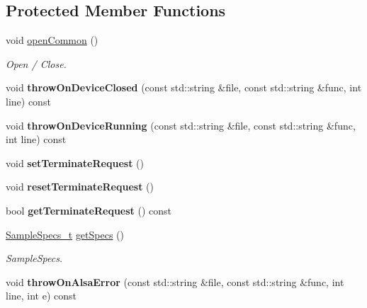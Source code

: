 \subsection*{Protected Member Functions}
\begin{DoxyCompactItemize}
\item 
\hypertarget{classNl_1_1AudioAlsa_a412c7a2b30dfb3b1b49ce63b7e84eb52}{}void \hyperlink{classNl_1_1AudioAlsa_a412c7a2b30dfb3b1b49ce63b7e84eb52}{open\+Common} ()\label{classNl_1_1AudioAlsa_a412c7a2b30dfb3b1b49ce63b7e84eb52}

\begin{DoxyCompactList}\small\item\em Open / Close. \end{DoxyCompactList}\item 
\hypertarget{classNl_1_1AudioAlsa_a409e810baf7f4c3f1ff7380b1f979721}{}void {\bfseries throw\+On\+Device\+Closed} (const std\+::string \&file, const std\+::string \&func, int line) const \label{classNl_1_1AudioAlsa_a409e810baf7f4c3f1ff7380b1f979721}

\item 
\hypertarget{classNl_1_1AudioAlsa_a96f03f2ab93bf0caec1ca9dc9fc03d6b}{}void {\bfseries throw\+On\+Device\+Running} (const std\+::string \&file, const std\+::string \&func, int line) const \label{classNl_1_1AudioAlsa_a96f03f2ab93bf0caec1ca9dc9fc03d6b}

\item 
\hypertarget{classNl_1_1AudioAlsa_af19fdd267bd17b21c0961cf6c17038c1}{}void {\bfseries set\+Terminate\+Request} ()\label{classNl_1_1AudioAlsa_af19fdd267bd17b21c0961cf6c17038c1}

\item 
\hypertarget{classNl_1_1AudioAlsa_aad8b3bce72a0812a4878d007006cd767}{}void {\bfseries reset\+Terminate\+Request} ()\label{classNl_1_1AudioAlsa_aad8b3bce72a0812a4878d007006cd767}

\item 
\hypertarget{classNl_1_1AudioAlsa_ac59db37cfc168cca3cad339b73798f6a}{}bool {\bfseries get\+Terminate\+Request} () const \label{classNl_1_1AudioAlsa_ac59db37cfc168cca3cad339b73798f6a}

\item 
\hypertarget{classNl_1_1AudioAlsa_acff797a11843617d06870f1fdef8fd2e}{}\hyperlink{structNl_1_1SampleSpecs__t}{Sample\+Specs\+\_\+t} \hyperlink{classNl_1_1AudioAlsa_acff797a11843617d06870f1fdef8fd2e}{get\+Specs} ()\label{classNl_1_1AudioAlsa_acff797a11843617d06870f1fdef8fd2e}

\begin{DoxyCompactList}\small\item\em Sample\+Specs. \end{DoxyCompactList}\item 
\hypertarget{classNl_1_1AudioAlsa_a49001b5030e29d798858025458a0d8ad}{}void {\bfseries throw\+On\+Alsa\+Error} (const std\+::string \&file, const std\+::string \&func, int line, int e) const \label{classNl_1_1AudioAlsa_a49001b5030e29d798858025458a0d8ad}

\end{DoxyCompactItemize}

